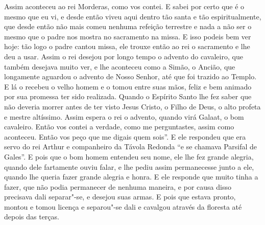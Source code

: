Assim aconteceu ao rei Morderas, como vos contei. E sabei por certo que é o
mesmo que eu vi, e desde então viveu aqui dentro tão santa e tão
espiritualmente, que desde então não mais comeu nenhuma refeição terrestre e
nada a não ser o mesmo que o padre nos mostra no sacramento na missa. E isso
podeis bem ver hoje: tão logo o padre cantou missa, ele trouxe então ao rei o
sacramento e lhe deu a usar. Assim o rei desejou por longo tempo o advento do
cavaleiro, que também desejava muito ver, e lhe aconteceu como a Simão, o
Ancião, que longamente aguardou o advento de Nosso Senhor, até que foi trazido
ao Templo. E lá o recebeu o velho homem e o tomou entre suas mãos, feliz e bem
animado por sua promessa ter sido realizada. Quando o Espírito Santo lhe fez
saber que não deveria morrer antes de ter visto Jesus Cristo, o Filho de Deus,
o alto profeta e mestre altíssimo. Assim espera o rei o advento, quando virá
Galaat, o bom cavaleiro. Então vos contei a verdade, como me perguntastes,
assim como aconteceu. Então vos peço que me digais quem sois”.
E ele respondeu que era servo do rei Arthur e companheiro da Távola Redonda “e
se chamava Parsifal de Gales”. E pois que o bom homem entendeu seu nome, ele
lhe fez grande alegria, quando dele fartamente ouviu falar, e lhe pediu assim
permanecesse junto a ele, quando lhe queria fazer grande alegria e honra. E ele
responde que muito tinha a fazer, que não podia permanecer de nenhuma maneira,
e por causa disso precisava dali separar"-se, e desejou suas armas. E pois que
estava pronto, montou e tomou licença e separou"-se dali e cavalgou através da
floresta até depois das terças. 


